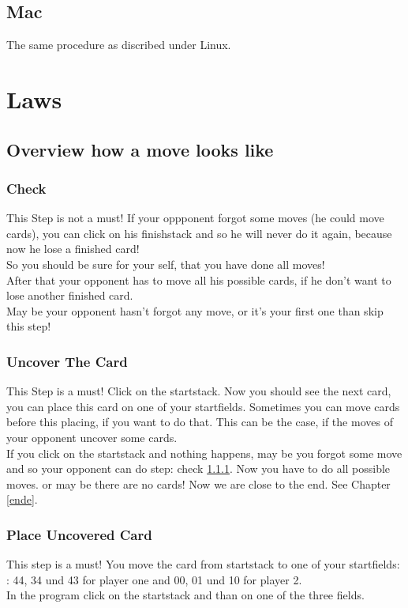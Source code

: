 \documentclass[12pt]{article}
\begin{document}
\subsection{Mac}
The same procedure as discribed under Linux.
\section{Laws}
\subsection{Overview how a move looks like}
\subsubsection{Check}
\label{ueberpruefen}
This Step is not a must!
If your oppponent forgot some moves (he could move cards), you can click on his finishstack and so 
he will never do it again, because now he lose a finished card!\\
So you should be sure for your self, that you have done all moves!\\
After that your opponent has to move all his possible cards, if he don't want to lose another finished card.\\
May be your opponent hasn't forgot any move, or it's your first one than skip this step!
\subsubsection{Uncover The Card}
This Step is a must!
Click on the startstack. Now you should see the next card, you can place this card on one of your
startfields.
Sometimes you can move cards before this placing, if you want to do that. This can be the case, if the 
moves of your opponent uncover some cards.\\
If you click on the startstack and nothing happens, may be you forgot some move and so your opponent
can do step: check \ref{ueberpruefen}. Now you have to do all possible moves.
or may be there are no cards! Now we are close to the end. See Chapter \ref{ende}.
\subsubsection{Place Uncovered Card}
This step is a must!
You move the card from startstack to one of your startfields: : 44, 34 und 43 for player one and 
00, 01 und 10 for player 2.\\
In the program click on the startstack and than on one of the three fields.
\end{document}
